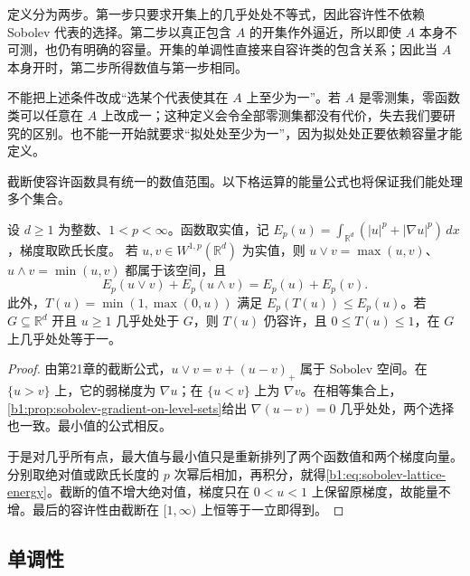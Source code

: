 定义分为两步。第一步只要求开集上的几乎处处不等式，因此容许性不依赖 Sobolev 代表的选择。第二步以真正包含 \(A\) 的开集作外逼近，所以即使 \(A\) 本身不可测，也仍有明确的容量。开集的单调性直接来自容许类的包含关系；因此当 \(A\) 本身开时，第二步所得数值与第一步相同。

\ProseParagraphBreak

不能把上述条件改成“选某个代表使其在 \(A\) 上至少为一”。若 \(A\) 是零测集，零函数类可以任意在 \(A\) 上改成一；这种定义会令全部零测集都没有代价，失去我们要研究的区别。也不能一开始就要求“拟处处至少为一”，因为拟处处正要依赖容量才能定义。

\ProseParagraphBreak

截断使容许函数具有统一的数值范围。以下格运算的能量公式也将保证我们能处理多个集合。

\begin{lemma}\label{b1:lem:sobolev-lattice-energy}
设 \(d\geq1\) 为整数、\(1<p<\infty\)。函数取实值，记 \(E_p(u)=\int_{\mathbb R^d}(|u|^p+|\nabla u|^p)\,dx\)，梯度取欧氏长度。
若 \(u,v\in W^{1,p}(\mathbb R^d)\) 为实值，则 \(u\vee v=\max(u,v)\)、\(u\wedge v=\min(u,v)\) 都属于该空间，且
\begin{equation}\label{b1:eq:sobolev-lattice-energy}
 E_p(u\vee v)+E_p(u\wedge v)=E_p(u)+E_p(v).
\end{equation}
此外，\(T(u)=\min(1,\max(0,u))\) 满足 \(E_p(T(u))\le E_p(u)\)。若 \(G\subseteq\mathbb R^d\) 开且 \(u\geq1\) 几乎处处于 \(G\)，则 \(T(u)\) 仍容许，且 \(0\le T(u)\le1\)，在 \(G\) 上几乎处处等于一。
\end{lemma}
\begin{proof}
由第21章的截断公式，\(u\vee v=v+(u-v)_+\) 属于 Sobolev 空间。在 \(\{u>v\}\) 上，它的弱梯度为 \(\nabla u\)；在 \(\{u<v\}\) 上为 \(\nabla v\)。在相等集合上，\cref{b1:prop:sobolev-gradient-on-level-sets}给出 \(\nabla(u-v)=0\) 几乎处处，两个选择也一致。最小值的公式相反。

于是对几乎所有点，最大值与最小值只是重新排列了两个函数值和两个梯度向量。分别取绝对值或欧氏长度的 \(p\) 次幂后相加，再积分，就得\eqref{b1:eq:sobolev-lattice-energy}。截断的值不增大绝对值，梯度只在 \(0<u<1\) 上保留原梯度，故能量不增。最后的容许性由截断在 \([1,\infty)\) 上恒等于一立即得到。
\end{proof}

\subsection{单调性}
\label{b1:subsec:260102}

